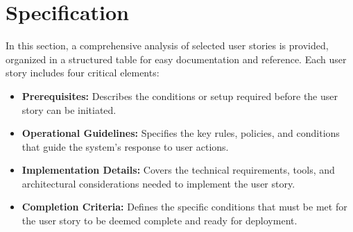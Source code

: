 \section{Specification}
In this section, a comprehensive analysis of selected user stories is provided, organized in a structured table for easy documentation and reference. Each user story includes four critical elements:
\begin{itemize}
    \item \textbf{Prerequisites:} Describes the conditions or setup required before the user story can be initiated.
    \item \textbf{Operational Guidelines:} Specifies the key rules, policies, and conditions that guide the system's response to user actions.
    \item \textbf{Implementation Details:} Covers the technical requirements, tools, and architectural considerations needed to implement the user story.
    \item \textbf{Completion Criteria:} Defines the specific conditions that must be met for the user story to be deemed complete and ready for deployment.
\end{itemize}
